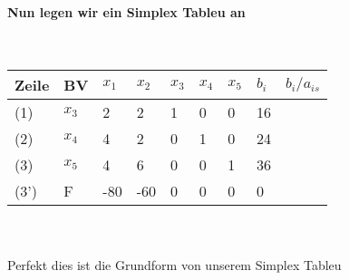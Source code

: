 \documentclass{article}
\begin{document}
\paragraph{Nun legen wir ein Simplex Tableu an}\mbox{}\\
\begin{tabular}{|l|l|l|l|l|l|l|l|l|}
	\hline
	Zeile & BV & $x_{1}$&$x_{2}$&$x_{3}$&$x_{4}$&$x_{5}$&$b_{i}$&$b_{i}/a_{is}$\\
	\hline
	(1)&$x_{3}$&2&2&1&0&0&16& \\
	\hline
	(2)&$x_{4}$&4&2&0&1&0&24& \\
	\hline
	(3)&$x_{5}$&4&6&0&0&1&36& \\
	\hline
	(3')&F&-80&-60&0&0&0&0&\\
	\hline
\end{tabular}\\\\
Perfekt dies ist die Grundform von unserem Simplex Tableu
\end{document}
